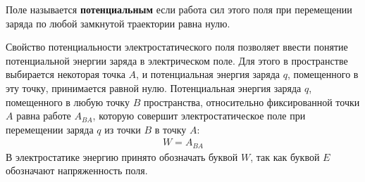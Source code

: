 \documentclass[__main__.tex]{subfiles}
\begin{document}
	\begin{definition}
		Поле называется \textbf{потенциальным} если работа сил этого поля при перемещении заряда по любой замкнутой траектории равна нулю.
	\end{definition}
	Свойство потенциальности электростатического поля позволяет ввести понятие потенциальной энергии заряда в электрическом поле. Для этого в пространстве выбирается некоторая точка $A$, и потенциальная энергия заряда $q$, помещенного в эту точку, принимается равной нулю. Потенциальная энергия заряда $q$, помещенного в любую точку $B$ пространства, относительно фиксированной точки $A$ равна работе $A_{BA}$, которую совершит электростатическое поле при перемещении заряда $q$ из точки $B$ в точку $A$:
	\begin{gather*}
		W = A_{BA}
	\end{gather*}
	В электростатике энергию принято обозначать буквой $W$, так как буквой $E$ обозначают напряженность поля.
\end{document}
